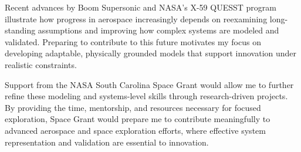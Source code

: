 \documentclass[12pt]{article}
\begin{document}
Recent advances by Boom Supersonic and NASA's X-59 QUESST program illustrate how progress in aerospace increasingly depends on reexamining long-standing assumptions and improving how complex systems are modeled and validated. Preparing to contribute to this future motivates my focus on developing adaptable, physically grounded models that support innovation under realistic constraints.

Support from the NASA South Carolina Space Grant would allow me to further refine these modeling and systems-level skills through research-driven projects. By providing the time, mentorship, and resources necessary for focused exploration, Space Grant would prepare me to contribute meaningfully to advanced aerospace and space exploration efforts, where effective system representation and validation are essential to innovation.
\end{document}
